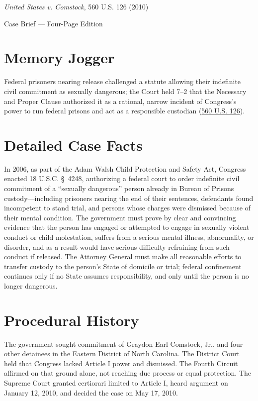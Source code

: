 \documentclass[12pt]{article}
\begin{document}
\begin{center}
{\LARGE \textit{United States v. Comstock}, 560 U.S. 126 (2010)\par}
\vspace{0.8em}
{\large Case Brief --- Four-Page Edition\par}
\end{center}
\vspace{1em}

\section{Memory Jogger}

Federal prisoners nearing release challenged a statute allowing their indefinite civil commitment as sexually dangerous; the Court held 7--2 that the Necessary and Proper Clause authorized it as a rational, narrow incident of Congress's power to run federal prisons and act as a responsible custodian (\href{https://supreme.justia.com/cases/federal/us/560/126/}{560 U.S. 126}).

\section{Detailed Case Facts}

In 2006, as part of the Adam Walsh Child Protection and Safety Act, Congress enacted 18 U.S.C. \S~4248, authorizing a federal court to order indefinite civil commitment of a ``sexually dangerous'' person already in Bureau of Prisons custody---including prisoners nearing the end of their sentences, defendants found incompetent to stand trial, and persons whose charges were dismissed because of their mental condition. The government must prove by clear and convincing evidence that the person has engaged or attempted to engage in sexually violent conduct or child molestation, suffers from a serious mental illness, abnormality, or disorder, and as a result would have serious difficulty refraining from such conduct if released. The Attorney General must make all reasonable efforts to transfer custody to the person's State of domicile or trial; federal confinement continues only if no State assumes responsibility, and only until the person is no longer dangerous.

\section{Procedural History}

The government sought commitment of Graydon Earl Comstock, Jr., and four other detainees in the Eastern District of North Carolina. The District Court held that Congress lacked Article I power and dismissed. The Fourth Circuit affirmed on that ground alone, not reaching due process or equal protection. The Supreme Court granted certiorari limited to Article I, heard argument on January 12, 2010, and decided the case on May 17, 2010.
\end{document}
